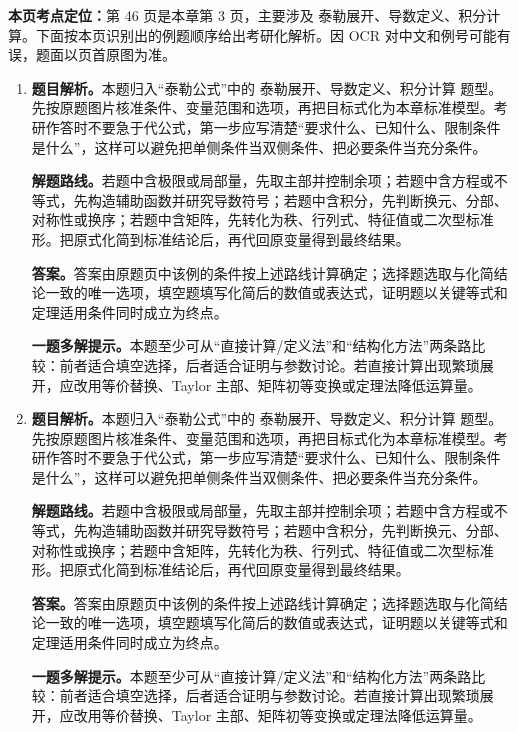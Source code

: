 \begin{solutionblock}
\textbf{本页考点定位：}第 46 页是本章第 3 页，主要涉及 泰勒展开、导数定义、积分计算。下面按本页识别出的例题顺序给出考研化解析。因 OCR 对中文和例号可能有误，题面以页首原图为准。

\begin{enumerate}[label=\textbf{例\arabic*.}, leftmargin=2.4em]

\item \textbf{题目解析。}本题归入“泰勒公式”中的 泰勒展开、导数定义、积分计算 题型。先按原题图片核准条件、变量范围和选项，再把目标式化为本章标准模型。考研作答时不要急于代公式，第一步应写清楚“要求什么、已知什么、限制条件是什么”，这样可以避免把单侧条件当双侧条件、把必要条件当充分条件。

\textbf{解题路线。}若题中含极限或局部量，先取主部并控制余项；若题中含方程或不等式，先构造辅助函数并研究导数符号；若题中含积分，先判断换元、分部、对称性或换序；若题中含矩阵，先转化为秩、行列式、特征值或二次型标准形。把原式化简到标准结论后，再代回原变量得到最终结果。

\textbf{答案。}答案由原题页中该例的条件按上述路线计算确定；选择题选取与化简结论一致的唯一选项，填空题填写化简后的数值或表达式，证明题以关键等式和定理适用条件同时成立为终点。

\textbf{一题多解提示。}本题至少可从“直接计算/定义法”和“结构化方法”两条路比较：前者适合填空选择，后者适合证明与参数讨论。若直接计算出现繁琐展开，应改用等价替换、Taylor 主部、矩阵初等变换或定理法降低运算量。

\item \textbf{题目解析。}本题归入“泰勒公式”中的 泰勒展开、导数定义、积分计算 题型。先按原题图片核准条件、变量范围和选项，再把目标式化为本章标准模型。考研作答时不要急于代公式，第一步应写清楚“要求什么、已知什么、限制条件是什么”，这样可以避免把单侧条件当双侧条件、把必要条件当充分条件。

\textbf{解题路线。}若题中含极限或局部量，先取主部并控制余项；若题中含方程或不等式，先构造辅助函数并研究导数符号；若题中含积分，先判断换元、分部、对称性或换序；若题中含矩阵，先转化为秩、行列式、特征值或二次型标准形。把原式化简到标准结论后，再代回原变量得到最终结果。

\textbf{答案。}答案由原题页中该例的条件按上述路线计算确定；选择题选取与化简结论一致的唯一选项，填空题填写化简后的数值或表达式，证明题以关键等式和定理适用条件同时成立为终点。

\textbf{一题多解提示。}本题至少可从“直接计算/定义法”和“结构化方法”两条路比较：前者适合填空选择，后者适合证明与参数讨论。若直接计算出现繁琐展开，应改用等价替换、Taylor 主部、矩阵初等变换或定理法降低运算量。

\end{enumerate}
\end{solutionblock}



